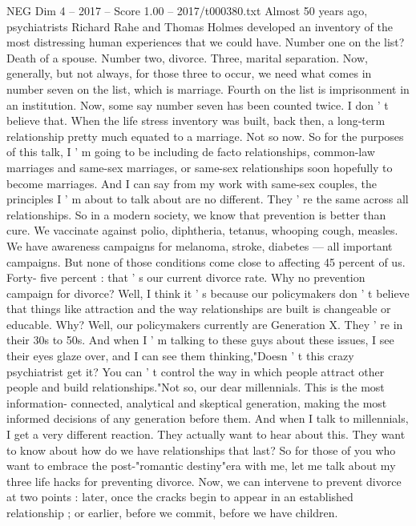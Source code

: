 \begin{textsample}{NEG Dim 4 – 2017 – Score 1.00 – 2017/t000380.txt}  \label{ex:f4_neg_041}
Almost 50 years ago, psychiatrists Richard Rahe and Thomas Holmes developed an inventory of the most distressing human experiences that we could have.
Number one on the list?
Death of a spouse.
Number two, divorce.
Three, marital separation.
Now, generally, but not always, for those three to occur, we need what comes in number seven on the list, which is marriage.
Fourth on the list is imprisonment in an institution.
Now, some say number seven has been counted twice.
I don ' t believe that.
When the life stress inventory was built, back then, a long-term relationship pretty much equated to a marriage.
Not so now.
So for the purposes of this talk, I ' m going to be including de facto relationships, common-law marriages and same-sex marriages, or same-sex relationships soon hopefully to become marriages.
And I can say from my work with same-sex couples, the principles I ' m about to talk about are no different.
They ' re the same across all relationships.
So in a modern society, we know that prevention is better than cure.
We vaccinate against polio, diphtheria, tetanus, whooping cough, measles.
We have awareness campaigns for melanoma, stroke, diabetes — all important campaigns.
But none of those conditions come close to affecting 45 percent of us.
Forty- five percent : that ' s our current divorce rate.
Why no prevention campaign for divorce?
Well, I think it ' s because our policymakers don ' t believe that things like attraction and the way relationships are built is changeable or educable.
Why?
Well, our policymakers currently are Generation X.
They ' re in their 30s to 50s.
And when I ' m talking to these guys about these issues, I see their eyes glaze over, and I can see them thinking,"Doesn ' t this crazy psychiatrist get it?
You can ' t control the way in which people attract other people and build relationships."Not so, our dear millennials.
This is the most information- connected, analytical and skeptical generation, making the most informed decisions of any generation before them.
And when I talk to millennials, I get a very different reaction.
They actually want to hear about this.
They want to know about how do we have relationships that last?
So for those of you who want to embrace the post-"romantic destiny"era with me, let me talk about my three life hacks for preventing divorce.
Now, we can intervene to prevent divorce at two points : later, once the cracks begin to appear in an established relationship ; or earlier, before we commit, before we have children.

\end{textsample}
